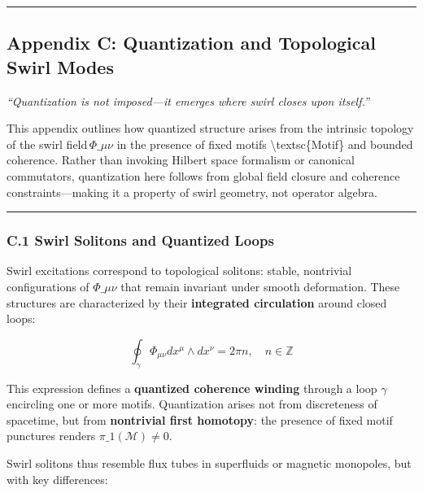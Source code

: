 \documentclass[
  11pt,
]{article}
\begin{document}
\begin{center}\rule{0.5\linewidth}{0.5pt}\end{center}

\subsection{\texorpdfstring{\textbf{Appendix C: Quantization and
Topological Swirl
Modes}}{Appendix C: Quantization and Topological Swirl Modes}}\label{appendix-c-quantization-and-topological-swirl-modes}

\emph{``Quantization is not imposed---it emerges where swirl closes upon
itself.''}

This appendix outlines how quantized structure arises from the intrinsic
topology of the swirl field\,\(\Phi\_{\mu\nu}\) in the presence of fixed
motifs \textbackslash textsc\{Motif\} and bounded coherence. Rather than
invoking Hilbert space formalism or canonical commutators, quantization
here follows from global field closure and coherence
constraints---making it a property of swirl geometry, not operator
algebra.

\begin{center}\rule{0.5\linewidth}{0.5pt}\end{center}

\subsubsection{\texorpdfstring{\textbf{C.1 Swirl Solitons and Quantized
Loops}}{C.1 Swirl Solitons and Quantized Loops}}\label{c.1-swirl-solitons-and-quantized-loops}

Swirl excitations correspond to topological solitons: stable, nontrivial
configurations of \(\Phi\_{\mu\nu}\) that remain invariant under smooth
deformation. These structures are characterized by their
\textbf{integrated circulation} around closed loops:

\[
\oint_{\gamma} \Phi_{\mu\nu} dx^\mu \wedge dx^\nu = 2\pi n, \quad n \in \mathbb{Z}
\]

This expression defines a \textbf{quantized coherence winding} through a
loop \(\gamma\) encircling one or more motifs. Quantization arises not
from discreteness of spacetime, but from \textbf{nontrivial first
homotopy}: the presence of fixed motif punctures renders
\(\pi\_1(\mathcal{M}) \ne 0\).

Swirl solitons thus resemble flux tubes in superfluids or magnetic
monopoles, but with key differences:
\end{document}
